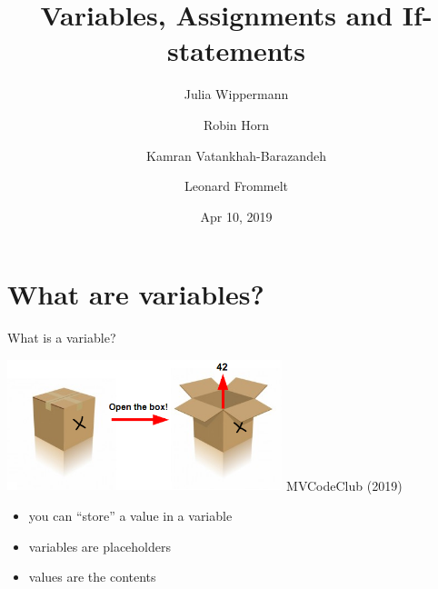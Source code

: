 \documentclass[
  american,
  ignorenonframetext,
]{beamer}
\title{Variables, Assignments and If-statements}
\author[J.~Wip., R.~Horn, K.~Vat.-Bar., L.~From.]{Julia Wippermann \and Robin Horn \and Kamran Vatankhah-Barazandeh \and Leonard Frommelt}
\date{Apr 10, 2019}
\providecommand{\tightlist}{%
  \setlength{\itemsep}{0pt}\setlength{\parskip}{0pt}}
\begin{document}
\frame[plain]{\titlepage}

\begin{frame}
  \tableofcontents[hideallsubsections]
\end{frame}

\hypertarget{what-are-variables}{%
\section{What are variables?}\label{what-are-variables}}

\begin{frame}{What is a variable?}
\protect\hypertarget{what-is-a-variable}{}

\includegraphics[width=0.6\textwidth,height=\textheight]{02_Variables_Assignments/var_box.png}
MVCodeClub (2019)

\begin{itemize}
\tightlist
\item
  you can ``store'' a value in a variable
\item
  variables are placeholders
\item
  values are the contents
\end{itemize}


\end{frame}
\end{document}
